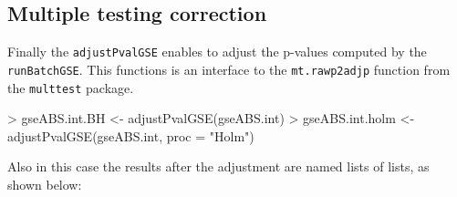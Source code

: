 \documentclass[11pt]{article}
\newcommand{\Rfunction}[1]{{\texttt{#1}}}
\newcommand{\Rpackage}[1]{{\texttt{#1}}}
\begin{document}
\subsection{Multiple testing correction}
Finally the \Rfunction{adjustPvalGSE} enables to adjust the
p-values computed by the \Rfunction{runBatchGSE}.
This functions is an interface to the \Rfunction{mt.rawp2adjp}
function from the \Rpackage{multtest} package.

\begin{Schunk}
\begin{Sinput}
> gseABS.int.BH <- adjustPvalGSE(gseABS.int)
> gseABS.int.holm <- adjustPvalGSE(gseABS.int, proc = "Holm")
\end{Sinput}
\end{Schunk}

Also in this case the results after the adjustment are named lists of lists,
as shown below:
\end{document}
